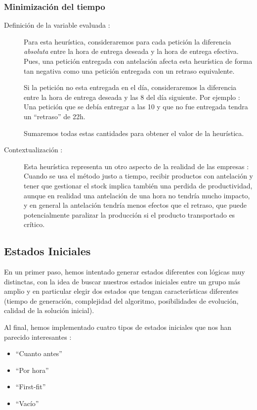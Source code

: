 \documentclass{article}
\begin{document}
\subsubsection{Minimización del tiempo}

\begin{description}
\item[Definición de la variable evaluada :] Para esta heurística, consideraremos
para cada petición la diferencia \emph{absoluta} entre la hora de entrega
deseada y la hora de entrega efectiva. Pues, una petición entregada con
antelación afecta esta heurística de forma tan negativa como una petición
entregada con un retraso equivalente.

Si la petición no esta entregada en el día, consideraremos la diferencia entre
la hora de entrega deseada y las 8 del día siguiente. Por ejemplo : Una petición
que se debía entregar a las 10 y que no fue entregada tendra un ``retraso'' de
22h.

Sumaremos todas estas cantidades para obtener el valor de la heurística.
\item[Contextualización :] Esta heurística representa un otro aspecto de la
realidad de las empresas : Cuando se usa el método justo a tiempo, recibir
productos con antelación y tener que gestionar el stock implica también una
perdida de productividad, aunque en realidad una antelación de una hora no
tendría mucho impacto, y en general la antelación tendría menos efectos que el
retraso, que puede potencialmente paralizar la producción si el producto
transportado es crítico.
\end{description}

\subsection{Estados Iniciales}

En un primer paso, hemos intentado generar estados diferentes con lógicas muy
distinctas, con la idea de buscar nuestros estados iniciales entre un grupo más
amplio y en particular elegir dos estados que tengan características diferentes
(tiempo de generación, complejidad del algoritmo, posibilidades de evolución,
calidad de la solución inicial).

Al final, hemos implementado cuatro tipos de estados iniciales que nos han
parecido interesantes :
\begin{itemize}
\item ``Cuanto antes''
\item ``Por hora''
\item ``First-fit''
\item ``Vacío''
\end{itemize}
\end{document}
